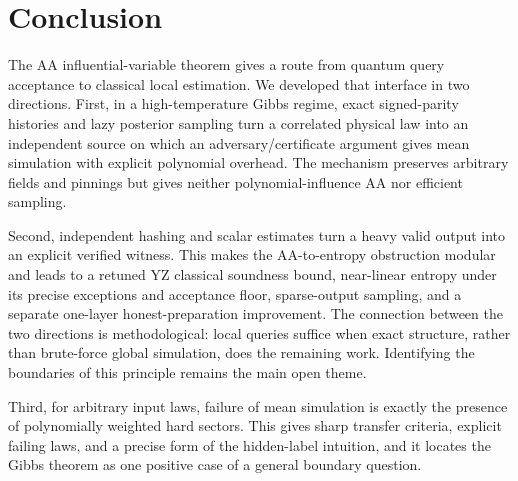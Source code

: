 \documentclass[11pt]{article}
\theoremstyle{definition}\newtheorem{definition}[theorem]{Definition}
\theoremstyle{remark}\newtheorem{remark}[theorem]{Remark}
\begin{document}
\section{Conclusion}\label{sec:conclusion}
The AA influential-variable theorem gives a route from quantum query acceptance to classical local estimation. We developed that interface in two directions. First, in a high-temperature Gibbs regime, exact signed-parity histories and lazy posterior sampling turn a correlated physical law into an independent source on which an adversary/certificate argument gives mean simulation with explicit polynomial overhead. The mechanism preserves arbitrary fields and pinnings but gives neither polynomial-influence AA nor efficient sampling.

Second, independent hashing and scalar estimates turn a heavy valid output into an explicit verified witness. This makes the AA-to-entropy obstruction modular and leads to a retuned YZ classical soundness bound, near-linear entropy under its precise exceptions and acceptance floor, sparse-output sampling, and a separate one-layer honest-preparation improvement. The connection between the two directions is methodological: local queries suffice when exact structure, rather than brute-force global simulation, does the remaining work. Identifying the boundaries of this principle remains the main open theme.

Third, for arbitrary input laws, failure of mean simulation is exactly the presence of polynomially weighted hard sectors. This gives sharp transfer criteria, explicit failing laws, and a precise form of the hidden-label intuition, and it locates the Gibbs theorem as one positive case of a general boundary question.
\end{document}
